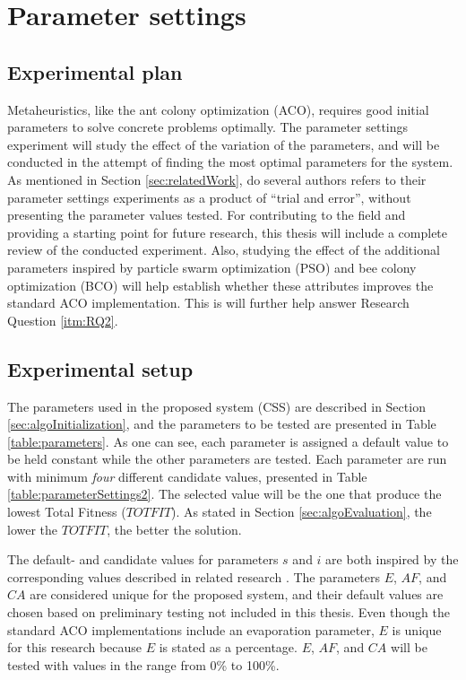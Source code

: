 \section{Parameter settings}
\label{sec:parametersettings}

\subsection{Experimental plan}
Metaheuristics, like the ant colony optimization (ACO), requires good initial parameters to solve concrete problems optimally. The parameter settings experiment will study the effect of the variation of the parameters, and will be conducted in the attempt of finding the most optimal parameters for the system. As mentioned in Section \vref{sec:relatedWork}, do several authors refers to their parameter settings experiments as a product of ``trial and error'', without presenting the parameter values tested. For contributing to the field and providing a starting point for future research, this thesis will include a complete review of the conducted experiment. %
Also, studying the effect of the additional parameters inspired by particle swarm optimization (PSO) and bee colony optimization (BCO) will help establish whether these attributes improves the standard ACO implementation. This is will further help answer Research Question \vref{itm:RQ2}.

\subsection{Experimental setup}
\label{subsec:parameterSettings_setup}
The parameters used in the proposed system (CSS) are described in Section \vref{sec:algoInitialization}, and the parameters to be tested are presented in Table \ref{table:parameters}. As one can see, each parameter is assigned a default value to be held constant while the other parameters are tested. Each parameter are run with minimum \textit{four} different candidate values, presented in Table \vref{table:parameterSettings2}. The selected value will be the one that produce the lowest Total Fitness ($TOTFIT$). As stated in Section \vref{sec:algoEvaluation}, the lower the $TOTFIT$, the better the solution. 

The default- and candidate values for parameters $s$ and $i$ are both inspired by the corresponding values described in related research \citep{salehi-nezhad07, poorzahedy11, sedighpour14, kechagiopoulos14}. The parameters $E$, $AF$, and $CA$ are considered unique for the proposed system, and their default values are chosen based on preliminary testing not included in this thesis. Even though the standard ACO implementations include an evaporation parameter, $E$ is unique for this research because $E$ is stated as a percentage. $E$, $AF$, and $CA$ will be tested with values in the range from 0\% to 100\%. %


